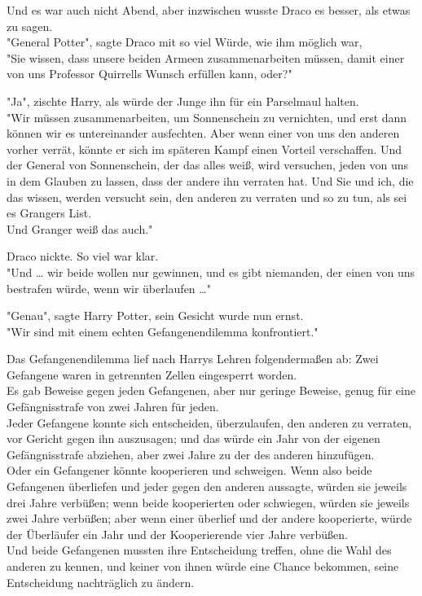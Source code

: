 {Und es war auch nicht Abend, aber inzwischen wusste Draco es besser, als etwas zu sagen.\\ "General Potter", sagte Draco mit so viel Würde, wie ihm möglich war,\\ "Sie wissen, dass unsere beiden Armeen zusammenarbeiten müssen, damit einer von uns Professor Quirrells Wunsch erfüllen kann, oder?"

"Ja", zischte Harry, als würde der Junge ihn für ein Parselmaul halten.\\ "Wir müssen zusammenarbeiten, um Sonnenschein zu vernichten, und erst dann können wir es untereinander ausfechten. Aber wenn einer von uns den anderen vorher verrät, könnte er sich im späteren Kampf einen Vorteil verschaffen. Und der General von Sonnenschein, der das alles weiß, wird versuchen, jeden von uns in dem Glauben zu lassen, dass der andere ihn verraten hat. Und Sie und ich, die das wissen, werden versucht sein, den anderen zu verraten und so zu tun, als sei es Grangers List.\\ Und Granger weiß das auch."

Draco nickte. So viel war klar.\\ "Und … wir beide wollen nur gewinnen, und es gibt niemanden, der einen von uns bestrafen würde, wenn wir überlaufen …"

"Genau", sagte Harry Potter, sein Gesicht wurde nun ernst.\\ "Wir sind mit einem echten Gefangenendilemma konfrontiert."

Das Gefangenendilemma lief nach Harrys Lehren folgendermaßen ab: Zwei Gefangene waren in getrennten Zellen eingesperrt worden.\\ Es gab Beweise gegen jeden Gefangenen, aber nur geringe Beweise, genug für eine Gefängnisstrafe von zwei Jahren für jeden.\\ Jeder Gefangene konnte sich entscheiden, überzulaufen, den anderen zu verraten, vor Gericht gegen ihn auszusagen; und das würde ein Jahr von der eigenen Gefängnisstrafe abziehen, aber zwei Jahre zu der des anderen hinzufügen.\\ Oder ein Gefangener könnte kooperieren und schweigen. Wenn also beide Gefangenen überliefen und jeder gegen den anderen aussagte, würden sie jeweils drei Jahre verbüßen; wenn beide kooperierten oder schwiegen, würden sie jeweils zwei Jahre verbüßen; aber wenn einer überlief und der andere kooperierte, würde der Überläufer ein Jahr und der Kooperierende vier Jahre verbüßen.\\ Und beide Gefangenen mussten ihre Entscheidung treffen, ohne die Wahl des anderen zu kennen, und keiner von ihnen würde eine Chance bekommen, seine Entscheidung nachträglich zu ändern.

}
